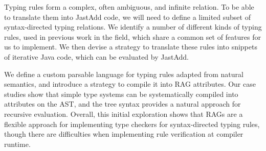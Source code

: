 \documentclass[nofilelist]{cslthse-msc}
\newcommand{\CR}[1]{\textcolor{green!60!black}{[\textbf{CR}:#1]}}
\begin{document}
Typing rules form a complex, often ambiguous, and infinite relation.
To be able to translate them into JastAdd code, we will need to define a limited subset of syntax-directed typing relations.
We identify a number of different kinds of typing rules, used in previous work in the field\cite{Pierce}, which share a common set of features for us to implement.
We then devise a strategy to translate these rules into snippets of iterative Java code, which can be evaluated by JastAdd.


We define a custom parsable language for typing rules adapted from natural semantics, and introduce a strategy to compile it into RAG attributes.
Our case studies show that simple type systems can be systematically compiled into attributes on the AST, and the tree syntax provides a natural approach for recursive evaluation.
Overall, this initial exploration shows that RAGs are a flexible approach for implementing type checkers for syntax-directed typing rules, though there are difficulties when implementing rule verification at compiler runtime.


\end{document}
